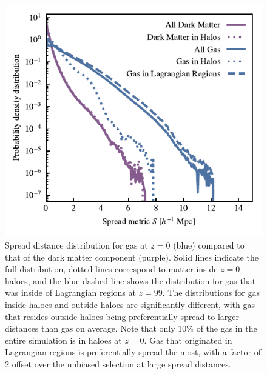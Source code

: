 \begin{figure}
    \centering
    \includegraphics{figures/s50j7kAHF/distance_plot_split_by_component+AHF.pdf}
    \vspace{-0.7cm}
    \caption{Spread distance distribution for gas at $z=0$ (blue) compared to
    that of the dark matter component (purple). Solid lines indicate the full
    distribution, dotted lines correspond to matter inside $z=0$ haloes, and
    the blue dashed line shows the distribution for gas that was inside of
    Lagrangian regions at $z=99$. The distributions for gas inside haloes and
    outside haloes are significantly different, with gas that resides outside
    haloes being preferentially spread to larger distances than gas on
    average. Note that only 10\% of the gas in the entire simulation is in
    haloes at $z=0$. Gas that originated in Lagrangian regions is
    preferentially spread the most, with a factor of 2 offset over the
    unbiased selection at large spread distances.}
    \label{fig:distbaryon}
\end{figure}

